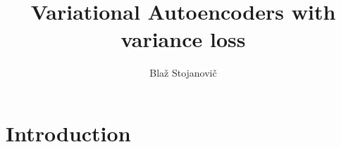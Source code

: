 \documentclass[final,3p,times,twocolumn]{elsarticle}
\begin{document}
\begin{frontmatter}



\title{Variational Autoencoders with variance loss}


\author{Bla\v z Stojanovi\v c}

\address{Cavendish Laboratory, Department of Physics, J J Thomson
  Avenue, Cambridge. CB3 0HE}

\begin{abstract}

\end{abstract}

\end{frontmatter}


\tableofcontents
\section{Introduction}
\end{document}
